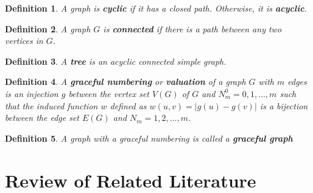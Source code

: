 \documentclass[a4paper, 11pt]{article}
\newtheorem{define}{Definition}
\begin{document}
\begin{define} A graph is \textbf{cyclic} if it has a closed path. Otherwise, it is \textbf{acyclic}.
\end{define}
\bigskip

\begin{define} A graph $G$ is \textbf{connected} if there is a path between any two vertices in $G$.
\end{define}
\bigskip

\begin{define} A \textbf{tree} is an acyclic connected simple graph.	
\end{define} \bigskip

\begin{define} A \textbf{graceful numbering} or \textbf{valuation} of a graph $G$ with $m$ edges is	an injection $g$ between the vertex set $V (G)$ of $G$ and $N^0_{m} = {0,1,\ldots,m}$ such that the induced function $w$ deﬁned as $w(u,v) = |g(u)−g(v)|$ is a bijection between the edge set $E(G)$ and $N_{m} = {1,2,\ldots,m}$.
\end{define}
\bigskip

\begin{define} A graph with a graceful numbering is called a \textbf{graceful graph}
\end{define}
\bigskip

\newpage
\section{Review of Related Literature}
\end{document}
